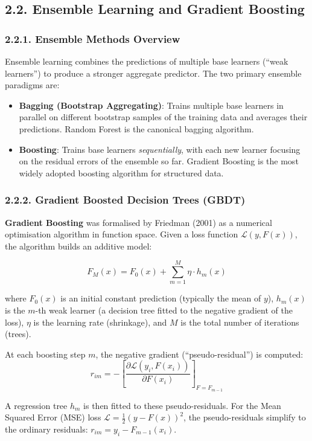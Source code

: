 \subsection{2.2. Ensemble Learning and Gradient Boosting}

\subsubsection{2.2.1. Ensemble Methods Overview}
Ensemble learning combines the predictions of multiple base learners (``weak learners'') to produce a stronger aggregate predictor. The two primary ensemble paradigms are:

\begin{itemize}
  \item \textbf{Bagging (Bootstrap Aggregating)}: Trains multiple base learners in parallel on different bootstrap samples of the training data and averages their predictions. Random Forest is the canonical bagging algorithm.
  \item \textbf{Boosting}: Trains base learners \textit{sequentially}, with each new learner focusing on the residual errors of the ensemble so far. Gradient Boosting is the most widely adopted boosting algorithm for structured data.
\end{itemize}

\subsubsection{2.2.2. Gradient Boosted Decision Trees (GBDT)}
\textbf{Gradient Boosting} was formalised by Friedman (2001) as a numerical optimisation algorithm in function space. Given a loss function $\mathcal{L}(y, F(x))$, the algorithm builds an additive model:

\[
F_M(x) = F_0(x) + \sum_{m=1}^{M} \eta \cdot h_m(x)
\]

where $F_0(x)$ is an initial constant prediction (typically the mean of $y$), $h_m(x)$ is the $m$-th weak learner (a decision tree fitted to the negative gradient of the loss), $\eta$ is the learning rate (shrinkage), and $M$ is the total number of iterations (trees).

At each boosting step $m$, the negative gradient (``pseudo-residual'') is computed:
\[
r_{im} = -\left[\frac{\partial \mathcal{L}(y_i, F(x_i))}{\partial F(x_i)}\right]_{F=F_{m-1}}
\]

A regression tree $h_m$ is then fitted to these pseudo-residuals. For the Mean Squared Error (MSE) loss $\mathcal{L} = \frac{1}{2}(y - F(x))^2$, the pseudo-residuals simplify to the ordinary residuals: $r_{im} = y_i - F_{m-1}(x_i)$.

